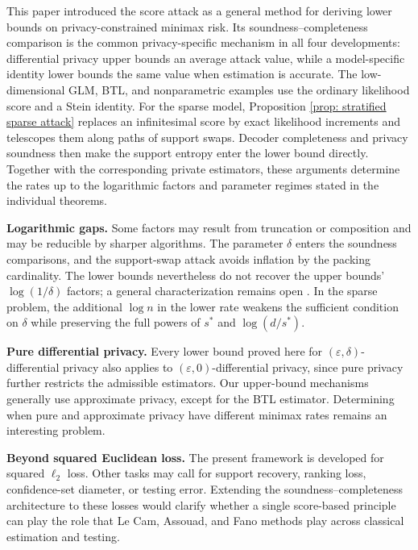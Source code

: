 \documentclass[letterpaper,12pt]{article}
\numberwithin{equation}{section}
\theoremstyle{plain}
\numberwithin{Theorem}{section}
\numberwithin{proposition}{section}
\numberwithin{Lemma}{section}
{
	\theoremstyle{definition}
	\newtheorem{Definition}{Definition}
	\newtheorem{example}{Example}
	\numberwithin{example}{section}
	\newtheorem{fact}{Fact}
	\numberwithin{fact}{section}
	\newtheorem{remark}{Remark}
}
\newcommand{\furtherrev}[1]{#1}
\newcommand{\1}{\mathbbm{1}}
\begin{document}
This paper introduced the score attack as a general method for deriving lower bounds on privacy-constrained minimax risk. Its soundness--completeness comparison is the common privacy-specific mechanism in all four developments: differential privacy upper bounds an average attack value, while a model-specific identity lower bounds the same value when estimation is accurate. The low-dimensional GLM, BTL, and \furtherrev{nonparametric} examples use the ordinary likelihood score and a Stein identity. For the sparse model, Proposition \ref{prop: stratified sparse attack} replaces an infinitesimal score by exact likelihood increments and telescopes them along paths of support swaps. Decoder completeness and privacy soundness then make the support entropy enter the lower bound directly. Together with the corresponding private estimators, these arguments determine the rates up to the logarithmic factors and parameter regimes stated in the individual theorems.

\textbf{Logarithmic gaps.} Some factors may result from truncation or composition and may be reducible by sharper algorithms. The parameter $\delta$ enters the soundness comparisons, and the support-swap attack avoids inflation by the packing cardinality. The lower bounds nevertheless do not recover the upper bounds' $\log(1/\delta)$ factors; a general characterization remains open \cite{steinke2017between,cai2021cost}. In the sparse problem, the additional $\log n$ in the lower rate weakens the sufficient condition on $\delta$ while preserving the full powers of $s^*$ and $\log(d/s^*)$.

\textbf{Pure differential privacy.} Every lower bound proved here for $(\varepsilon,\delta)$-differential privacy also applies to $(\varepsilon,0)$-differential privacy, since pure privacy further restricts the admissible estimators. Our upper-bound mechanisms generally use approximate privacy, except for the BTL estimator. Determining when pure and approximate privacy have different minimax rates remains an interesting problem.

\textbf{Beyond squared Euclidean loss.} The present framework is developed for squared $\ell_2$ loss. Other tasks may call for support recovery, ranking loss, confidence-set diameter, or testing error. Extending the soundness--completeness architecture to these losses would clarify whether a single score-based principle can play the role that Le Cam, Assouad, and Fano methods play across classical estimation and testing.
\end{document}

